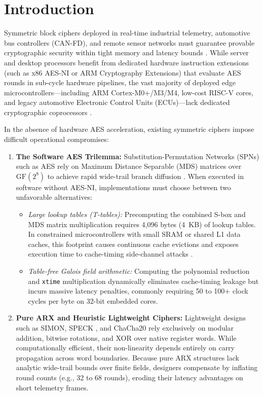 \documentclass[10pt,twocolumn]{article}
\begin{document}
\section{Introduction}
\label{sec:intro}
Symmetric block ciphers deployed in real-time industrial telemetry, automotive bus controllers (CAN-FD), and remote sensor networks must guarantee provable cryptographic security within tight memory and latency bounds \cite{shannon1949communication, daemen2002design, beaulieu2015simon}. While server and desktop processors benefit from dedicated hardware instruction extensions (such as x86 AES-NI or ARM Cryptography Extensions) that evaluate AES rounds in sub-cycle hardware pipelines, the vast majority of deployed edge microcontrollers---including ARM Cortex-M0+/M3/M4, low-cost RISC-V cores, and legacy automotive Electronic Control Units (ECUs)---lack dedicated cryptographic coprocessors \cite{beierle2020alzette, kaartinen2009comparative}.

In the absence of hardware AES acceleration, existing symmetric ciphers impose difficult operational compromises:
\begin{enumerate}
    \item \textbf{The Software AES Trilemma:} Substitution-Permutation Networks (SPNs) such as AES \cite{nist2001fips} rely on Maximum Distance Separable (MDS) matrices over $\text{GF}(2^8)$ to achieve rapid wide-trail branch diffusion \cite{daemen2002design}. When executed in software without AES-NI, implementations must choose between two unfavorable alternatives:
    \begin{itemize}
        \item \emph{Large lookup tables (T-tables):} Precomputing the combined S-box and MDS matrix multiplication requires 4,096 bytes (4~KB) of lookup tables. In constrained microcontrollers with small SRAM or shared L1 data caches, this footprint causes continuous cache evictions and exposes execution time to cache-timing side-channel attacks \cite{bernstein2005cache, gueron2010intel}.
        \item \emph{Table-free Galois field arithmetic:} Computing the polynomial reduction and \texttt{xtime} multiplication dynamically eliminates cache-timing leakage but incurs massive latency penalties, commonly requiring 50 to 100+ clock cycles per byte on 32-bit embedded cores.
    \end{itemize}
    \item \textbf{Pure ARX and Heuristic Lightweight Ciphers:} Lightweight designs such as SIMON, SPECK \cite{beaulieu2015simon}, and ChaCha20 \cite{nir2018chacha20} rely exclusively on modular addition, bitwise rotations, and XOR over native register words. While computationally efficient, their non-linearity depends entirely on carry propagation across word boundaries. Because pure ARX structures lack analytic wide-trail bounds over finite fields, designers compensate by inflating round counts (e.g., 32 to 68 rounds), eroding their latency advantages on short telemetry frames.
\end{enumerate}
\end{document}
